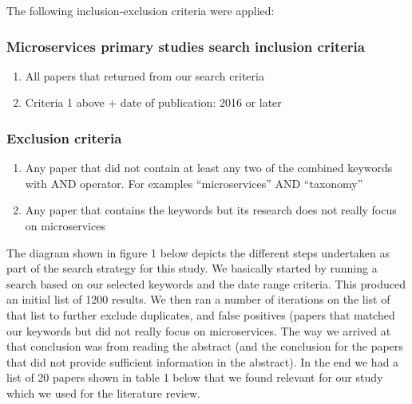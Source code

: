 \documentclass{article}
\begin{document}
The following inclusion-exclusion criteria were applied:

\subsubsection{Microservices primary studies search inclusion criteria}

\begin{enumerate} 


\item All papers that returned from our search criteria
\item Criteria 1 above + date of publication: 2016 or later
\end{enumerate}

\subsubsection{Exclusion criteria}


\begin{enumerate}


\item Any paper that did not contain at least any two of the combined keywords with AND operator. For examples “microservices” AND “taxonomy”
\item Any paper that contains the keywords but its research does not really focus on microservices 
\end{enumerate} 

The diagram shown in figure 1 below depicts the different steps undertaken as part of the search strategy for this study. We basically started by running a search based on our selected keywords and the date range criteria. This produced an initial list of 1200 results. We then ran a number of iterations on the list of that list to further exclude duplicates, and false positives (papers that matched our keywords but did not really focus on microservices. The way we arrived at that conclusion was from reading the abstract (and the conclusion for the papers that did not provide sufficient information in the abstract). In the end we had a list of 20 papers shown in table 1 below that we found relevant for our study which we used for the literature review.
\end{document}
